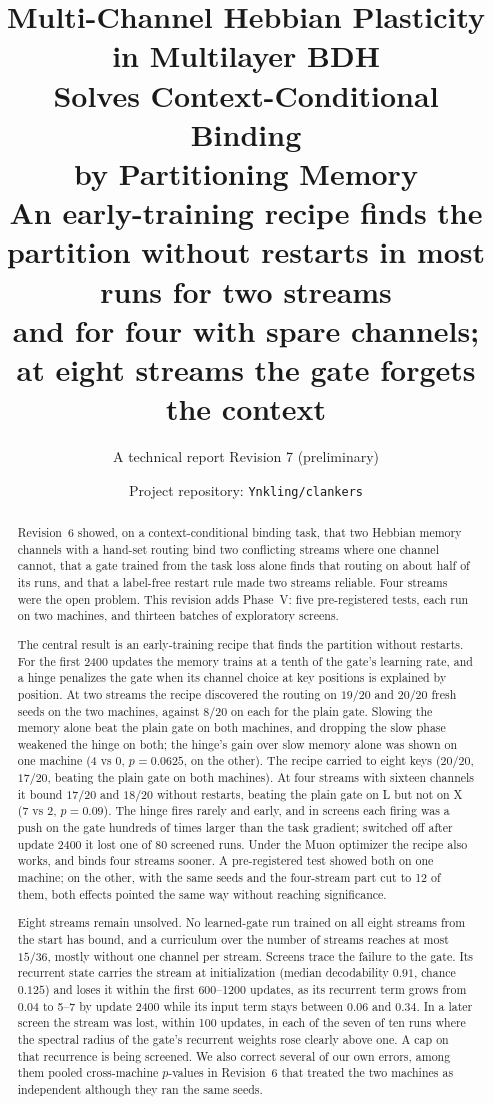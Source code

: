 \documentclass[11pt]{article}
\title{\vspace{-2.5em}\bfseries Multi-Channel Hebbian Plasticity in Multilayer BDH\\
Solves Context-Conditional Binding\\ by Partitioning Memory\\[0.3em]
\large\normalfont An early-training recipe finds the partition without restarts in most runs for two streams\\ and for four with spare channels; at eight streams the gate forgets the context}
\author{A technical report \quad\textbullet\quad Revision 7 (preliminary)}
\date{Project repository: \texttt{Ynkling/clankers}}
\begin{document}
\maketitle
\vspace{-1.5em}

\begin{abstract}
\noindent
Revision~6 showed, on a context-conditional binding task, that two Hebbian memory channels with a hand-set routing bind two conflicting streams where one channel cannot, that a gate trained from the task loss alone finds that routing on about half of its runs, and that a label-free restart rule made two streams reliable. Four streams were the open problem. This revision adds Phase~V: five pre-registered tests, each run on two machines, and thirteen batches of exploratory screens.

The central result is an early-training recipe that finds the partition without restarts. For the first 2400 updates the memory trains at a tenth of the gate's learning rate, and a hinge penalizes the gate when its channel choice at key positions is explained by position. At two streams the recipe discovered the routing on $19/20$ and $20/20$ fresh seeds on the two machines, against $8/20$ on each for the plain gate. Slowing the memory alone beat the plain gate on both machines, and dropping the slow phase weakened the hinge on both; the hinge's gain over slow memory alone was shown on one machine (4 vs 0, $p = 0.0625$, on the other). The recipe carried to eight keys ($20/20$, $17/20$, beating the plain gate on both machines). At four streams with sixteen channels it bound $17/20$ and $18/20$ without restarts, beating the plain gate on L but not on X (7 vs 2, $p = 0.09$). The hinge fires rarely and early, and in screens each firing was a push on the gate hundreds of times larger than the task gradient; switched off after update 2400 it lost one of 80 screened runs. Under the Muon optimizer the recipe also works, and binds four streams sooner. A pre-registered test showed both on one machine; on the other, with the same seeds and the four-stream part cut to 12 of them, both effects pointed the same way without reaching significance.

Eight streams remain unsolved. No learned-gate run trained on all eight streams from the start has bound, and a curriculum over the number of streams reaches at most $15/36$, mostly without one channel per stream. Screens trace the failure to the gate. Its recurrent state carries the stream at initialization (median decodability $0.91$, chance $0.125$) and loses it within the first 600--1200 updates, as its recurrent term grows from $0.04$ to 5--7 by update 2400 while its input term stays between $0.06$ and $0.34$. In a later screen the stream was lost, within 100 updates, in each of the seven of ten runs where the spectral radius of the gate's recurrent weights rose clearly above one. A cap on that recurrence is being screened. We also correct several of our own errors, among them pooled cross-machine $p$-values in Revision~6 that treated the two machines as independent although they ran the same seeds.
\end{abstract}
\end{document}
